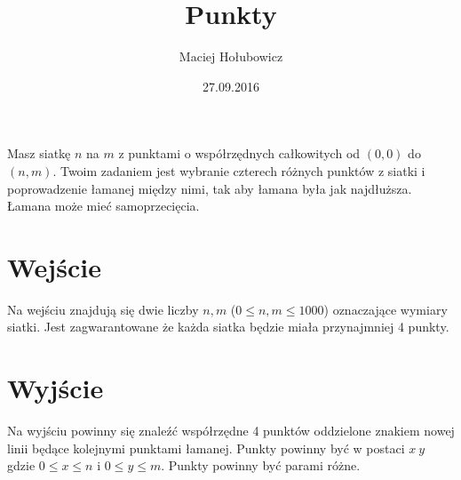 \documentclass[zad,zawodnik,utf8]{sinol}
\title{Punkty}
\author{Maciej Hołubowicz} %
\date{27.09.2016}
\begin{document}
  \begin{tasktext}%
  Masz siatkę $n$ na $m$ z punktami o współrzędnych całkowitych od $(0, 0)$ do $(n, m)$. Twoim zadaniem jest wybranie czterech różnych punktów z siatki i poprowadzenie łamanej między nimi, tak aby łamana była jak najdłuższa. Łamana może mieć samoprzecięcia. 
  
 \section{Wejście}
    
Na wejściu znajdują się dwie liczby $n, m$ ($0 \leq n, m \leq 1000$) oznaczające wymiary siatki. Jest zagwarantowane że każda siatka będzie miała przynajmniej 4 punkty.

  \section{Wyjście}
    Na wyjściu powinny się znaleźć współrzędne 4 punktów oddzielone znakiem nowej linii będące kolejnymi punktami łamanej. Punkty powinny być w postaci $x~y$ gdzie $0 \leq x \leq n$ i $0 \leq y \leq m$. Punkty powinny być parami różne.
    
     \makecompactexample

  \end{tasktext}
\end{document}

